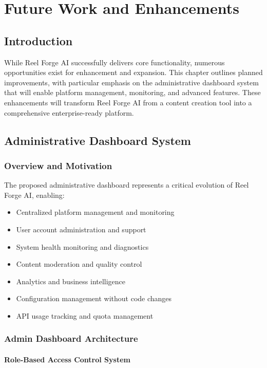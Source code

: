 \chapter{Future Work and Enhancements}

\section{Introduction}

While Reel Forge AI successfully delivers core functionality, numerous opportunities exist for enhancement and expansion. This chapter outlines planned improvements, with particular emphasis on the administrative dashboard system that will enable platform management, monitoring, and advanced features. These enhancements will transform Reel Forge AI from a content creation tool into a comprehensive enterprise-ready platform.

\section{Administrative Dashboard System}

\subsection{Overview and Motivation}

The proposed administrative dashboard represents a critical evolution of Reel Forge AI, enabling:

\begin{itemize}
    \item Centralized platform management and monitoring
    \item User account administration and support
    \item System health monitoring and diagnostics
    \item Content moderation and quality control
    \item Analytics and business intelligence
    \item Configuration management without code changes
    \item API usage tracking and quota management
\end{itemize}

\subsection{Admin Dashboard Architecture}

\subsubsection{Role-Based Access Control System}

